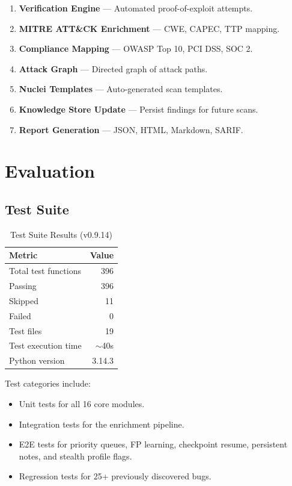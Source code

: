 \documentclass[12pt,a4paper]{article}
\begin{document}
\begin{enumerate}
    \item \textbf{Verification Engine} — Automated proof-of-exploit attempts.
    \item \textbf{MITRE ATT\&CK Enrichment} — CWE, CAPEC, TTP mapping.
    \item \textbf{Compliance Mapping} — OWASP Top 10, PCI DSS, SOC 2.
    \item \textbf{Attack Graph} — Directed graph of attack paths.
    \item \textbf{Nuclei Templates} — Auto-generated scan templates.
    \item \textbf{Knowledge Store Update} — Persist findings for future scans.
    \item \textbf{Report Generation} — JSON, HTML, Markdown, SARIF.
\end{enumerate}

\section{Evaluation}

\subsection{Test Suite}

\begin{table}[H]
\centering
\begin{tabular}{lr}
\toprule
\textbf{Metric} & \textbf{Value} \\
\midrule
Total test functions  & 396 \\
Passing               & 396 \\
Skipped               & 11 \\
Failed                & 0 \\
Test files             & 19 \\
Test execution time    & $\sim$40s \\
Python version         & 3.14.3 \\
\bottomrule
\end{tabular}
\caption{Test Suite Results (v0.9.14)}
\end{table}

Test categories include:
\begin{itemize}
    \item Unit tests for all 16 core modules.
    \item Integration tests for the enrichment pipeline.
    \item E2E tests for priority queues, FP learning, checkpoint resume,
          persistent notes, and stealth profile flags.
    \item Regression tests for 25+ previously discovered bugs.
\end{itemize}
\end{document}
